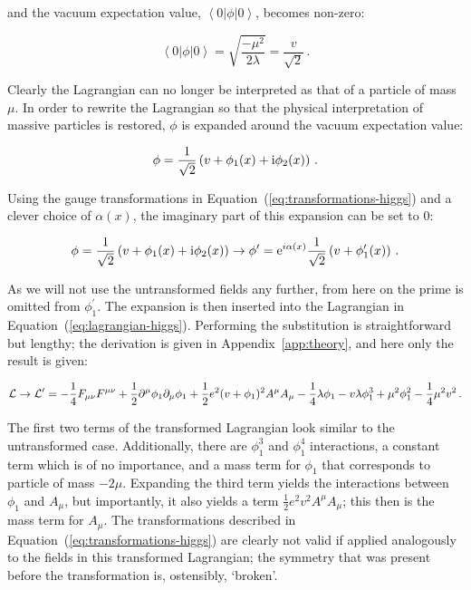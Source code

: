 % 
and the vacuum expectation value, $\left< 0 | \phi | 0 \right>$, becomes non-zero:
% 
\begin{linenomath*}
\begin{equation}
\left< 0 | \phi | 0 \right> = \sqrt{ \frac{-\mu^2}{2\lambda} } = \frac{v}{\sqrt{2}}
\,.
\end{equation}
\end{linenomath*}
% 
Clearly the Lagrangian can no longer be interpreted as that of a particle of mass $\mu$.
% 
In order to rewrite the Lagrangian so that the physical interpretation of massive particles is restored, $\phi$ is expanded around the vacuum expectation value:
% 
\begin{linenomath*}
\begin{equation}
\label{eq:expansion-around-minimum}
\phi = \frac{1}{\sqrt{2}} \left( v + \phi_1(x) + \mathrm{i} \phi_2(x) \right)
\,.
\end{equation}
\end{linenomath*}
% 
Using the gauge transformations in Equation~(\ref{eq:transformations-higgs}) and a clever choice of $\alpha(x)$, the imaginary part of this expansion can be set to $0$:
% 
\begin{linenomath*}
\begin{equation}
\phi = \frac{1}{\sqrt{2}} \left( v + \phi_1(x) + \mathrm{i} \phi_2(x) \right)
\to
\phi^\prime = \mathrm{e}^{i\alpha(x)} \frac{1}{\sqrt{2}} \left( v + \phi^\prime_1(x) \right)
\,.
\end{equation}
\end{linenomath*}
% 
As we will not use the untransformed fields any further, from here on the prime is omitted from $\phi_1^\prime$.
% 
The expansion is then inserted into the Lagrangian in Equation~(\ref{eq:lagrangian-higgs}).
% 
Performing the substitution is straightforward but lengthy; the derivation is given in Appendix~\ref{app:theory}, and here only the result is given:
% 
\begin{linenomath*}
\begin{equation}
\mathcal{L} \to \mathcal{L}^\prime =
    -\frac{1}{4} F_{\mu\nu} F^{\mu\nu}
    + \frac{1}{2} \partial^\mu \phi_1 \partial_\mu \phi_1
    + \frac{1}{2} e^2 (v+\phi_1)^2 A^\mu A_\mu
    - \frac{1}{4}\lambda\phi_1 - v\lambda\phi_1^3 + \mu^2\phi_1^2 - \frac{1}{4}\mu^2 v^2
\,.
\end{equation}
\end{linenomath*}
% 
The first two terms of the transformed Lagrangian look similar to the untransformed case.
% 
Additionally, there are $\phi_1^3$ and $\phi_1^4$ interactions, a constant term which is of no importance, and a mass term for $\phi_1$ that corresponds to particle of mass $-2\mu$.
% 
Expanding the third term yields the interactions between $\phi_1$ and $A_\mu$, but importantly, it also yields a term $\frac{1}{2}e^2v^2 A^\mu A_\mu$; this then is the mass term for $A_\mu$.
% 
The transformations described in Equation~(\ref{eq:transformations-higgs}) are clearly not valid if applied analogously to the fields in this transformed Lagrangian; the symmetry that was present before the transformation is, ostensibly, `broken'.



